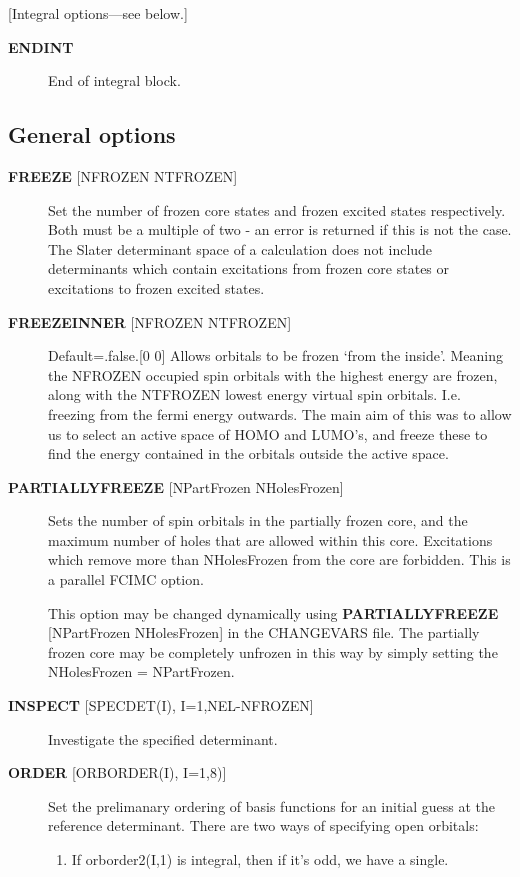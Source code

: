 \documentclass[openany,a4paper,10pt,english]{manual}
\begin{document}
{[}Integral options---see below.{]}
\begin{description}
\item[\textbf{ENDINT}] \leavevmode
End of integral block.

\end{description}


\subsection{General options}
\begin{description}
\item[\textbf{FREEZE} {[}NFROZEN NTFROZEN{]}] \leavevmode
Set the number of frozen core states and frozen excited states
respectively.  Both must be a multiple of two - an error is returned
if this is not the case.  The Slater determinant space of a
calculation does not include determinants which contain excitations from
frozen core states or excitations to frozen excited states.

\item[\textbf{FREEZEINNER} {[}NFROZEN NTFROZEN{]}] \leavevmode
Default=.false.{[}0 0{]}
Allows orbitals to be frozen `from the inside'.  Meaning the NFROZEN occupied
spin orbitals with the highest energy are frozen, along with the NTFROZEN
lowest energy virtual spin orbitals.  I.e. freezing from the fermi energy
outwards.
The main aim of this was to allow us to select an active space of HOMO and
LUMO's, and freeze these to find the energy contained in the orbitals outside
the active space.

\item[\textbf{PARTIALLYFREEZE} {[}NPartFrozen NHolesFrozen{]}] \leavevmode
Sets the number of spin orbitals in the partially frozen core, and the
maximum number of holes that are allowed within this core.
Excitations which remove more than NHolesFrozen from the core are forbidden.
This is a parallel FCIMC option.

This option may be changed dynamically using \textbf{PARTIALLYFREEZE} {[}NPartFrozen
NHolesFrozen{]} in the CHANGEVARS file.  The partially frozen core may be
completely unfrozen in this way by simply setting the NHolesFrozen = NPartFrozen.

\item[\textbf{INSPECT} {[}SPECDET(I), I=1,NEL-NFROZEN{]}] \leavevmode
Investigate the specified determinant.

\item[\textbf{ORDER} {[}ORBORDER(I), I=1,8){]}] \leavevmode
Set the prelimanary ordering of basis functions for an initial guess
at the reference determinant.  There are two ways of specifying
open orbitals:
\begin{enumerate}
\item {} 
If orborder2(I,1) is integral, then if it's odd, we have a single.


\end{enumerate}
\end{description}
\end{document}
